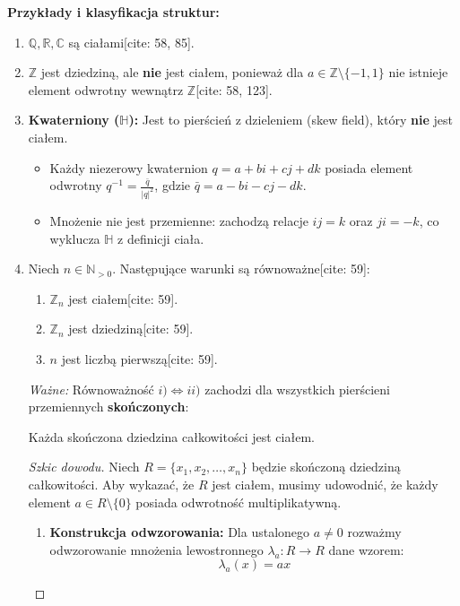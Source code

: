 \noindent \textbf{Przykłady i klasyfikacja struktur:}
\begin{enumerate}[label=\arabic*)]
    \item $\mathbb{Q}, \mathbb{R}, \mathbb{C}$ są ciałami[cite: 58, 85].
    \item $\mathbb{Z}$ jest dziedziną, ale \textbf{nie} jest ciałem, ponieważ dla $a \in \mathbb{Z} \setminus \{-1, 1\}$ nie istnieje element odwrotny wewnątrz $\mathbb{Z}$[cite: 58, 123].
    
    \item \textbf{Kwaterniony ($\mathbb{H}$):} Jest to pierścień z dzieleniem (skew field), który \textbf{nie} jest ciałem. 
    \begin{itemize}
        \item Każdy niezerowy kwaternion $q = a + bi + cj + dk$ posiada element odwrotny $q^{-1} = \frac{\bar{q}}{|q|^2}$, gdzie $\bar{q} = a - bi - cj - dk$.
        \item Mnożenie nie jest przemienne: zachodzą relacje $ij = k$ oraz $ji = -k$, co wyklucza $\mathbb{H}$ z definicji ciała.
    \end{itemize}

    \item Niech $n \in \mathbb{N}_{>0}$. Następujące warunki są równoważne[cite: 59]:
    \begin{enumerate}[label=\roman*)]
        \item $\mathbb{Z}_n$ jest ciałem[cite: 59].
        \item $\mathbb{Z}_n$ jest dziedziną[cite: 59].
        \item $n$ jest liczbą pierwszą[cite: 59].
    \end{enumerate}
    \textit{Ważne:} Równoważność $i) \iff ii)$ zachodzi dla wszystkich pierścieni przemiennych \textbf{skończonych}:
    \begin{theorem}
Każda skończona dziedzina całkowitości jest ciałem.
\end{theorem}

\begin{proof}[Szkic dowodu]
Niech $R = \{x_1, x_2, \dots, x_n\}$ będzie skończoną dziedziną całkowitości. 
Aby wykazać, że $R$ jest ciałem, musimy udowodnić, że każdy element $a \in R \setminus \{0\}$ posiada odwrotność multiplikatywną.

\begin{enumerate}
    \item \textbf{Konstrukcja odwzorowania:} Dla ustalonego $a \neq 0$ rozważmy odwzorowanie mnożenia lewostronnego $\lambda_a: R \to R$ dane wzorem:
    \[ \lambda_a(x) = ax \]
    

\end{enumerate}
\end{proof}
\end{enumerate}
